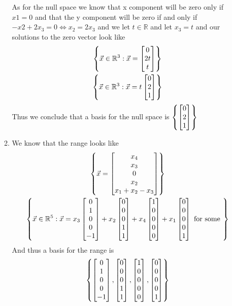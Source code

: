 \documentclass[11pt]{book}
\begin{document}
\begin{ex}
\begin{itemize}
\begin{enumerate}
                As for the null space we know that x component will be zero only if $x1 = 0$ and that the y component will be zero if and only if $-x2 + 2x_3 = 0 \Leftrightarrow x_2 = 2x_3$ and we let $t \in \mathbb{R}$ and let $x_3 = t$ and our solutions to the zero vector look like
                \begin{gather*}
                    \left\{ \vec{x} \in \mathbb{R}^3: \vec{x} = \begin{bmatrix} 0 \\ 2t \\ t \end{bmatrix} \right\}\\
                    \left\{ \vec{x} \in \mathbb{R}^3: \vec{x} = t\begin{bmatrix} 0 \\ 2 \\ 1 \end{bmatrix} \right\}
                \end{gather*}
                Thus we conclude that a basis for the null space is  $\left\{ \begin{bmatrix} 0 \\ 2 \\ 1 \end{bmatrix} \right\}$ 
                \item We know that the range looks like
                \begin{gather*}
                    \left\{ \vec{x} = \begin{bmatrix} x_4 \\ x_3 \\ 0 \\ x_2 \\ x_1 + x_2 - x_3  \end{bmatrix} \right\}\\
                    \left\{ \vec{x} \in \mathbb{R}^{5}: \vec{x} = x_{3} \begin{bmatrix} 0 \\ 1 \\ 0 \\ 0 \\ -1 \end{bmatrix} + x_2 \begin{bmatrix} 0 \\ 0 \\ 0 \\ 1 \\ 1 \end{bmatrix} + x_4\begin{bmatrix} 1 \\ 0 \\ 0 \\ 0 \\ 0 \end{bmatrix} + x_1 \begin{bmatrix} 0 \\ 0 \\ 0 \\ 0 \\ 1 \end{bmatrix} \text{ for some  }\right\}
                \end{gather*}
                And thus a basis for the range is 
                \[
                \left\{ \begin{bmatrix} 0 \\ 1 \\ 0 \\ 0 \\ -1 \end{bmatrix}, \begin{bmatrix} 0 \\ 0 \\ 0 \\ 1 \\ 1 \end{bmatrix}, \begin{bmatrix} 1 \\ 0 \\ 0 \\ 0 \\ 0 \end{bmatrix}, \begin{bmatrix} 0 \\ 0 \\ 0 \\ 0 \\ 1 \end{bmatrix} \right\}
\]
\end{enumerate}
\end{itemize}
\end{ex}
\end{document}
